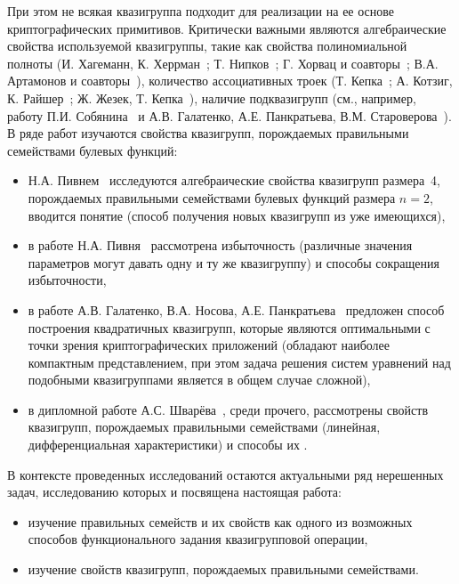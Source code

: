     При этом не всякая квазигруппа подходит для реализации на ее основе криптографических примитивов.
    Критически важными являются алгебраические свойства используемой квазигруппы, такие как свойства полиномиальной полноты (И. Хагеманн, К. Херрман~\autocite{hagemann}; Т. Нипков~\autocite{nipkow1990unification}; Г. Хорвац и соавторы~\autocite{horvath2008}; В.А. Артамонов и соавторы~\autocite{artamonov2016characterization}), количество ассоциативных троек (Т. Кепка~\autocite{kepka1980note}; А. Котзиг, К. Райшер~\autocite{kotzig83}; Ж. Жезек, Т. Кепка~\autocite{ass_summary}), наличие подквазигрупп (см., например, работу П.И. Собянина~\autocite{sobyanin19} и А.В. Галатенко, А.Е. Панкратьева, В.М. Староверова~\autocite{galatenko21subquasi}).
    В ряде работ изучаются свойства квазигрупп, порождаемых правильными семействами булевых функций:
    \begin{itemize}
        \item Н.А. Пивнем~\autocite{piven18} исследуются алгебраические свойства квазигрупп размера~4, порождаемых правильными семействами булевых функций размера $n = 2$, вводится понятие  (способ получения новых квазигрупп из уже имеющихся),
        \item в работе Н.А. Пивня~\autocite{piven19} рассмотрена избыточность  (различные значения параметров могут давать одну и ту же квазигруппу) и способы сокращения избыточности,
        \item в работе А.В. Галатенко, В.А. Носова, А.Е. Панкратьева~\autocite{galatenko20quad} предложен способ построения квадратичных квазигрупп, которые являются оптимальными с точки зрения криптографических приложений (обладают наиболее компактным представлением, при этом задача решения систем уравнений над подобными квазигруппами является в общем случае сложной),
        \item в дипломной работе А.С. Шварёва~\autocite{shvaryov24}, среди прочего, рассмотрены  свойств квазигрупп, порождаемых правильными семействами (линейная, дифференциальная характеристики) и способы их .
    \end{itemize}

    В контексте проведенных исследований остаются актуальными ряд нерешенных задач, исследованию которых и посвящена настоящая работа:
    \begin{itemize}
        \item изучение правильных семейств и их свойств как одного из возможных способов функционального задания квазигрупповой операции,
        \item изучение свойств квазигрупп, порождаемых правильными семействами.
    \end{itemize}

